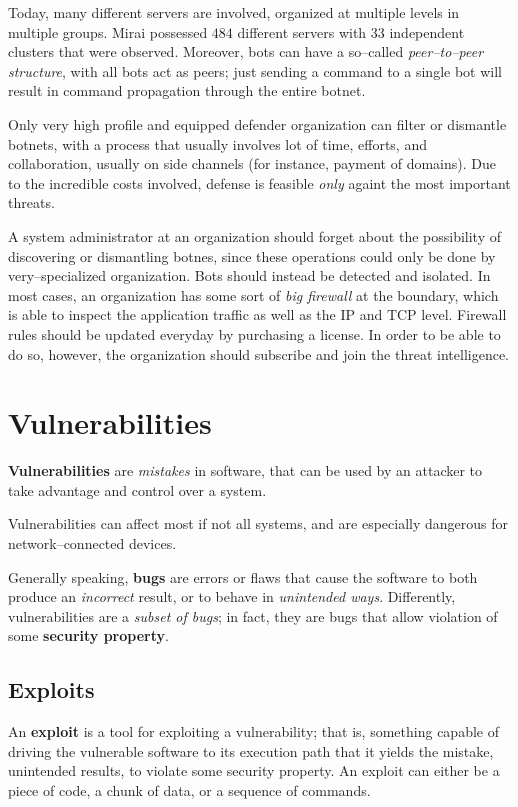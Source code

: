 \documentclass[10pt]{extbook}
\begin{document}
Today, many different servers are involved, organized at multiple levels in
multiple groups. Mirai possessed $484$ different servers with $33$ independent
clusters that were observed. Moreover, bots can have a so--called
\emph{peer--to--peer structure}, with all bots act as peers; just sending a
command to a single bot will result in command propagation through the entire
botnet.

Only very high profile and equipped defender organization can filter or
dismantle botnets, with a process that usually involves lot of time, efforts,
and collaboration, usually on side channels (for instance, payment of domains).
Due to the incredible costs involved, defense is feasible \emph{only} againt
the most important threats.

A system administrator at an organization should forget about the possibility
of discovering or dismantling botnes, since these operations could only be done
by very--specialized organization. Bots should instead be detected and isolated.
In most cases, an organization has some sort of \emph{big firewall} at the
boundary, which is able to inspect the application traffic as well as the IP
and TCP level. Firewall rules should be updated everyday by purchasing a
license. In order to be able to do so, however, the organization should
subscribe and join the threat intelligence.

\section{Vulnerabilities}

\textbf{Vulnerabilities} are \emph{mistakes} in software, that can be used by
an attacker to take advantage and control over a system.

Vulnerabilities can affect most if not all systems, and are especially
dangerous for network--connected devices.

Generally speaking, \textbf{bugs} are errors or flaws that cause the software
to both produce an \emph{incorrect} result, or to behave in \emph{unintended
ways}. Differently, vulnerabilities are a \emph{subset of bugs}; in fact, they
are bugs that allow violation of some \textbf{security property}.

\subsection{Exploits}

An \textbf{exploit} is a tool for exploiting a vulnerability; that is,
something capable of driving the vulnerable software to its execution path that
it yields the mistake, unintended results, to violate some security property.
An exploit can either be a piece of code, a chunk of data, or a sequence of
commands.
\end{document}
